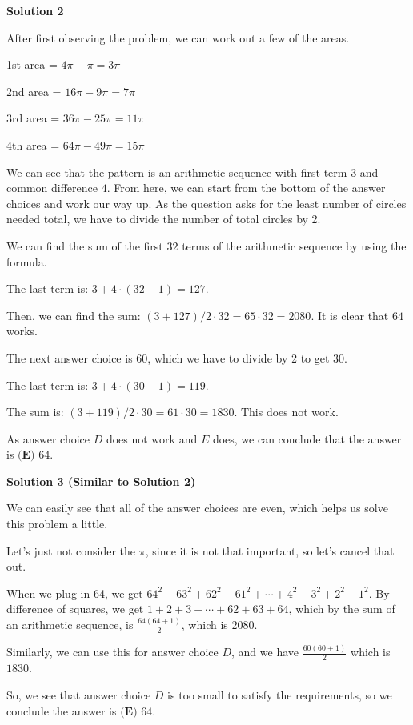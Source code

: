 \begin{enumerate}
\textbf{Solution 2}

After first observing the problem, we can work out a few of the areas.

 1st area = $4\pi-\pi = 3\pi$

 2nd area = $16\pi-9\pi = 7\pi$

 3rd area = $36\pi-25\pi = 11\pi$

 4th area = $64\pi-49\pi = 15\pi$

 We can see that the pattern is an arithmetic sequence with first term $3$ and common difference $4$. From here, we can start from the bottom of the answer choices and work our way up. As the question asks for the least number of circles needed total, we have to divide the number of total circles by 2.

 We can find the sum of the first $32$ terms of the arithmetic sequence by using the formula.

 The last term is: $3 + 4\cdot(32-1) = 127$. 

 Then, we can find the sum: $(3+127)/2 \cdot 32 = 65\cdot32 = 2080$. It is clear that $64$ works.

 The next answer choice is $60$, which we have to divide by 2 to get $30$.

 The last term is: $3 + 4\cdot(30-1) = 119$.

 The sum is: $(3+119)/2 \cdot 30 = 61\cdot30 = 1830$. This does not work.

 As answer choice $D$ does not work and $E$ does, we can conclude that the answer is $\boxed{\textbf{(E) } 64}$.

 



\textbf{Solution 3 (Similar to Solution 2)}

We can easily see that all of the answer choices are even, which helps us solve this problem a little.

 Let's just not consider the $\pi$, since it is not that important, so let's cancel that out.

 When we plug in 64, we get $64^2-63^2+62^2-61^2+\cdots +4^2-3^2+2^2-1^2$. By difference of squares, we get $1+2+3+\cdots+62+63+64$, which by the sum of an arithmetic sequence, is $\frac{64(64+1)}{2}$, which is $2080$.

 Similarly, we can use this for answer choice $D$, and we have $\frac{60(60+1)}{2}$ which is $1830$.

 So, we see that answer choice $D$ is too small to satisfy the requirements, so we conclude the answer is $\boxed{\textbf{(E) } 64}$.


\end{enumerate}
